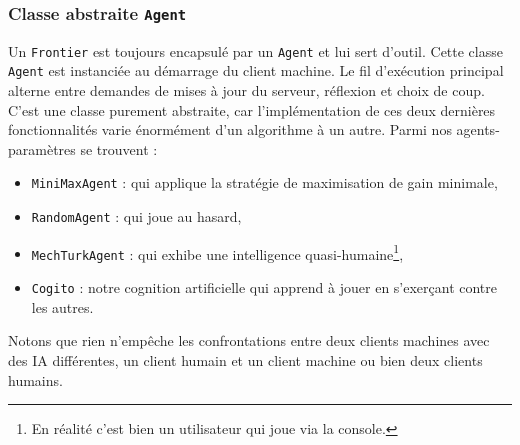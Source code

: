 \subsubsection{Classe abstraite \texttt{Agent}}
Un \texttt{Frontier} est toujours encapsulé par un \texttt{Agent} et lui sert d'outil. Cette classe \texttt{Agent} est instanciée au démarrage du client machine. Le fil d'exécution principal alterne entre demandes de mises à jour du serveur, réflexion et choix de coup. C'est une classe purement abstraite, car l'implémentation de ces deux dernières fonctionnalités varie énormément d'un algorithme à un autre. Parmi nos agents-paramètres se trouvent :
\begin{itemize}
\item \texttt{MiniMaxAgent} : qui applique la stratégie de maximisation de gain minimale,
\item \texttt{RandomAgent} : qui joue au hasard,
\item \texttt{MechTurkAgent} : qui exhibe une intelligence quasi-humaine\footnote{En réalité c'est bien un utilisateur qui joue via la console.},
\item \texttt{Cogito} : notre cognition artificielle qui apprend à jouer en s'exerçant contre les autres.
\end{itemize}
Notons que rien n'empêche les confrontations entre deux clients machines avec des IA différentes, un client humain et un client machine ou bien deux clients humains.